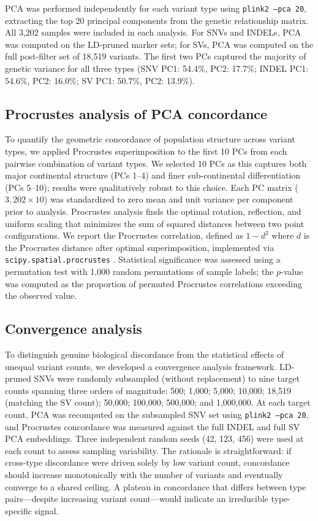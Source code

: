 PCA was performed independently for each variant type using \texttt{plink2 --pca 20}, extracting the top 20 principal components from the genetic relationship matrix. All 3,202 samples were included in each analysis. For SNVs and INDELs, PCA was computed on the LD-pruned marker sets; for SVs, PCA was computed on the full post-filter set of 18,519 variants. The first two PCs captured the majority of genetic variance for all three types (SNV PC1: 54.4\%, PC2: 17.7\%; INDEL PC1: 54.6\%, PC2: 16.0\%; SV PC1: 50.7\%, PC2: 13.9\%).

\subsection*{Procrustes analysis of PCA concordance}

To quantify the geometric concordance of population structure across variant types, we applied Procrustes superimposition \citep{gower1975} to the first 10 PCs from each pairwise combination of variant types. We selected 10 PCs as this captures both major continental structure (PCs 1--4) and finer sub-continental differentiation (PCs 5--10); results were qualitatively robust to this choice. Each PC matrix ($3{,}202 \times 10$) was standardized to zero mean and unit variance per component prior to analysis. Procrustes analysis finds the optimal rotation, reflection, and uniform scaling that minimizes the sum of squared distances between two point configurations. We report the Procrustes correlation, defined as $1 - d^2$ where $d$ is the Procrustes distance after optimal superimposition, implemented via \texttt{scipy.spatial.procrustes} \citep{virtanen2020}. Statistical significance was assessed using a permutation test with 1,000 random permutations of sample labels; the $p$-value was computed as the proportion of permuted Procrustes correlations exceeding the observed value.

\subsection*{Convergence analysis}

To distinguish genuine biological discordance from the statistical effects of unequal variant counts, we developed a convergence analysis framework. LD-pruned SNVs were randomly subsampled (without replacement) to nine target counts spanning three orders of magnitude: 500; 1,000; 5,000; 10,000; 18,519 (matching the SV count); 50,000; 100,000; 500,000; and 1,000,000. At each target count, PCA was recomputed on the subsampled SNV set using \texttt{plink2 --pca 20}, and Procrustes concordance was measured against the full INDEL and full SV PCA embeddings. Three independent random seeds (42, 123, 456) were used at each count to assess sampling variability. The rationale is straightforward: if cross-type discordance were driven solely by low variant count, concordance should increase monotonically with the number of variants and eventually converge to a shared ceiling. A plateau in concordance that differs between type pairs---despite increasing variant count---would indicate an irreducible type-specific signal.

